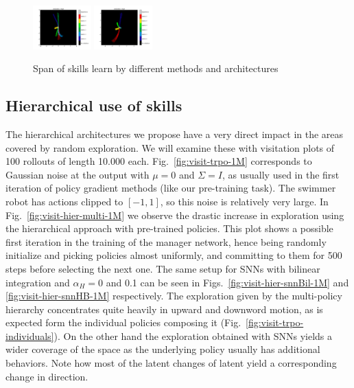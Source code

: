 \documentclass{article} %
\begin{document}
\begin{figure}[h]
{		\includegraphics[trim={2cm 0 1cm 1.5cm}, clip, width = 0.2\textwidth]{Figures/visit-snn-Bil-01MI.png}
		\includegraphics[trim={2cm 0 1cm 1.5cm}, clip, width = 0.2\textwidth]{Figures/visit-snn-Bil-1MI.png}
	}
	\caption{Span of skills learn by different methods and architectures}
	\label{fig:visit_methods}
\end{figure}


\subsection{Hierarchical use of skills}

The hierarchical architectures we propose have a very direct impact in the areas covered by random exploration. We will examine these with visitation plots of 100 rollouts of length 10.000 each. Fig.\ \ref{fig:visit-trpo-1M} corresponds to Gaussian noise at the output with $\mu=0$ and $\Sigma=I$, as usually used in the first iteration of policy gradient methods (like our pre-training task). The swimmer robot has actions clipped to $[-1,1]$, so this noise is relatively very large. In Fig.\ \ref{fig:visit-hier-multi-1M} we observe the drastic increase in exploration using the hierarchical approach with pre-trained policies. This plot shows a possible first iteration in the training of the manager network, hence being randomly initialize and picking policies almost uniformly, and committing to them for 500 steps before selecting the next one. The same setup for SNNs with bilinear integration and $\alpha_H= 0$ and 0.1 can be seen in Figs.\ \ref{fig:visit-hier-snnBil-1M} and \ref{fig:visit-hier-snnHB-1M} respectively. The exploration given by the multi-policy hierarchy concentrates quite heavily in upward and downword motion, as is expected form the individual policies composing it (Fig.\ \ref{fig:visit-trpo-individuals}). On the other hand the exploration obtained with SNNs yields a wider coverage of the space as the underlying policy usually has additional behaviors. Note how most of the latent changes of latent yield a corresponding change in direction.
\end{document}
